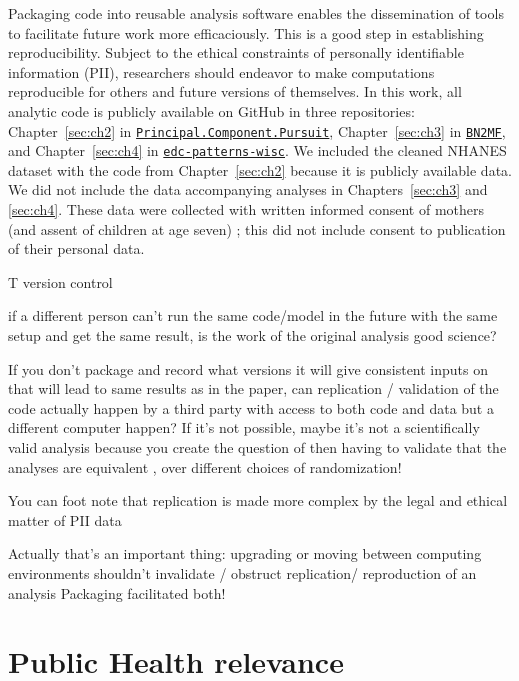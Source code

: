 Packaging code into reusable analysis software enables the dissemination of tools to facilitate future work more efficaciously. This is a good step in establishing reproducibility. Subject to the ethical constraints of personally identifiable information (PII), researchers should endeavor to make computations reproducible for others and future versions of themselves. In this work, all analytic code is publicly available on GitHub in three repositories: Chapter~\ref{sec:ch2} in \texttt{\href{https://github.com/lizzyagibson/Principal.Component.Pursuit}{Principal.Component.Pursuit}}, Chapter~\ref{sec:ch3} in \texttt{\href{https://github.com/lizzyagibson/BN2MF}{BN2MF}}, and Chapter~\ref{sec:ch4} in \texttt{\href{https://github.com/lizzyagibson/edc-patterns-wisc}{edc-patterns-wisc}}. We included the cleaned NHANES dataset with the code from Chapter~\ref{sec:ch2} because it is publicly available data. We did not include the data accompanying analyses in Chapters~\ref{sec:ch3} and \ref{sec:ch4}. These data were collected with written informed consent of mothers (and assent of children at age seven) \citep{perera03}; this did not include consent to publication of their personal data.

T
version control

if a different person can’t run the same code/model in the future with the same setup and get the same result, is the work of the original analysis good science?

If you don’t package and record what versions it will give consistent inputs on that will lead to same results as in the paper, can replication / validation of the code actually happen by a third party with access to both code and data but a different computer happen? If it’s not possible, maybe it’s not a scientifically valid analysis because you create the question of then having to validate that the analyses are equivalent , over different choices of randomization!

You can foot note that replication is made more complex by the legal and ethical matter of PII data 

Actually that’s an important thing: upgrading or moving between computing environments shouldn’t invalidate / obstruct replication/ reproduction of an analysis
Packaging facilitated both!


\section{Public Health relevance}\label{sec:ph}
